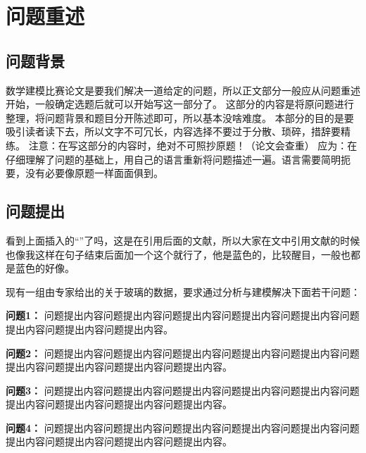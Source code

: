 \section{问题重述}

\subsection{问题背景}

数学建模比赛论文是要我们解决一道给定的问题，所以正文部分一般应从问题重述开始，一般确定选题后就可以开始写这一部分了。
这部分的内容是将原问题进行整理，将问题背景和题目分开陈述即可，所以基本没啥难度。
本部分的目的是要吸引读者读下去，所以文字不可冗长，内容选择不要过于分散、琐碎，措辞要精练。
注意：在写这部分的内容时，绝对不可照抄原题！（论文会查重）
应为：在仔细理解了问题的基础上\cite{ref1}，用自己的语言重新将问题描述一遍。语言需要简明扼要，没有必要像原题一样面面俱到。


\subsection{问题提出}

看到上面插入的“\cite{ref1}”了吗，这是在引用后面的文献，所以大家在文中引用文献的时候也像我这样在句子结束后面加一个这个就行了，他是蓝色的，比较醒目，一般也都是蓝色的好像。

现有一组由专家给出的关于玻璃的数据，要求通过分析与建模解决下面若干问题：

\textbf{问题1：} 问题提出内容问题提出内容问题提出内容问题提出内容问题提出内容问题提出内容问题提出内容问题提出内容。

\textbf{问题2：} 问题提出内容问题提出内容问题提出内容问题提出内容问题提出内容问题提出内容问题提出内容问题提出内容问题提出内容。

\textbf{问题3：} 问题提出内容问题提出内容问题提出内容问题提出内容问题提出内容问题提出内容问题提出内容问题提出内容问题提出内容。

\textbf{问题4：} 问题提出内容问题提出内容问题提出内容问题提出内容问题提出内容问题提出内容问题提出内容问题提出内容问题提出内容。